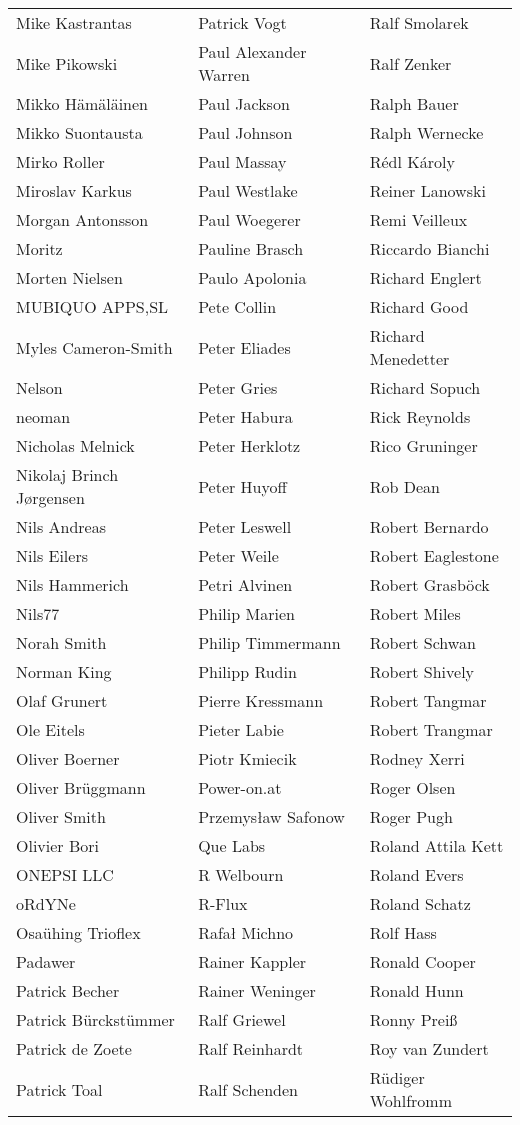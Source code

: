\begin{tabular}{p{4.5cm}p{4.5cm}p{4.5cm}}
Mike Kastrantas & Patrick Vogt & Ralf Smolarek \\
Mike Pikowski & Paul Alexander Warren & Ralf Zenker \\
Mikko Hämäläinen & Paul Jackson & Ralph Bauer \\
Mikko Suontausta & Paul Johnson & Ralph Wernecke \\
Mirko Roller & Paul Massay & Rédl Károly \\
Miroslav Karkus & Paul Westlake & Reiner Lanowski \\
Morgan Antonsson & Paul Woegerer & Remi Veilleux \\
Moritz & Pauline Brasch & Riccardo Bianchi \\
Morten Nielsen & Paulo Apolonia & Richard Englert \\
MUBIQUO APPS,SL & Pete Collin & Richard Good \\
Myles Cameron-Smith & Peter Eliades & Richard Menedetter \\
Nelson & Peter Gries & Richard Sopuch \\
neoman & Peter Habura & Rick Reynolds \\
Nicholas Melnick & Peter Herklotz & Rico Gruninger \\
Nikolaj Brinch Jørgensen & Peter Huyoff & Rob Dean \\
Nils Andreas & Peter Leswell & Robert Bernardo \\
Nils Eilers & Peter Weile & Robert Eaglestone \\
Nils Hammerich & Petri Alvinen & Robert Grasböck \\
Nils77 & Philip Marien & Robert Miles \\
Norah Smith & Philip Timmermann & Robert Schwan \\
Norman King & Philipp Rudin & Robert Shively \\
Olaf Grunert & Pierre Kressmann & Robert Tangmar \\
Ole Eitels & Pieter Labie & Robert Trangmar \\
Oliver Boerner & Piotr Kmiecik & Rodney Xerri \\
Oliver Brüggmann & Power-on.at & Roger Olsen \\
Oliver Smith & Przemysław Safonow & Roger Pugh \\
Olivier Bori & Que Labs & Roland Attila Kett \\
ONEPSI LLC & R Welbourn & Roland Evers \\
oRdYNe & R-Flux & Roland Schatz \\
Osaühing Trioflex & Rafał Michno & Rolf Hass \\
Padawer & Rainer Kappler & Ronald Cooper \\
Patrick Becher & Rainer Weninger & Ronald Hunn \\
Patrick Bürckstümmer & Ralf Griewel & Ronny Preiß \\
Patrick de Zoete & Ralf Reinhardt & Roy van Zundert \\
Patrick Toal & Ralf Schenden & Rüdiger Wohlfromm \\
\end{tabular}
